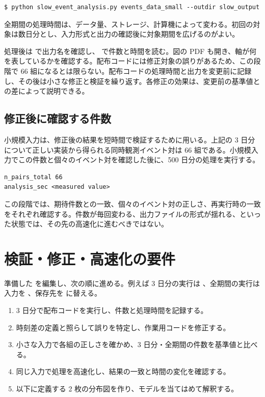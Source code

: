 \begin{lstlisting}[numbers=none, xleftmargin=2\zw]
$ python slow_event_analysis.py events_data_small --outdir slow_output
\end{lstlisting}

全期間の処理時間は、データ量、ストレージ、計算機によって変わる。初回の対象は数日分とし、入力形式と出力の確認後に対象期間を広げるのがよい。

処理後は  で出力名を確認し、 で件数と時間を読む。図の PDF も開き、軸が何を表しているかを確認する。配布コードには修正対象の誤りがあるため、この段階で 66 組になるとは限らない。配布コードの処理時間と出力を変更前に記録し、その後は小さな修正と検証を繰り返す。各修正の効果は、変更前の基準値との差によって説明できる。

\subsection{修正後に確認する件数}

小規模入力は、修正後の結果を短時間で検証するために用いる。上記の 3 日分について正しい実装から得られる同時観測イベント対は 66 組である。小規模入力でこの件数と個々のイベント対を確認した後に、500 日分の処理を実行する。

\begin{lstlisting}[numbers=none, xleftmargin=2\zw]
n_pairs_total 66
analysis_sec <measured value>
\end{lstlisting}

この段階では、期待件数との一致、個々のイベント対の正しさ、再実行時の一致をそれぞれ確認する。件数が毎回変わる、出力ファイルの形式が揺れる、といった状態では、その先の高速化に進むべきではない。

\section{検証・修正・高速化の要件}

準備した  を編集し、次の順に進める。例えば 3 日分の実行は 、全期間の実行は入力を 、保存先を  に替える。

\begin{enumerate}
\item 3 日分で配布コードを実行し、件数と処理時間を記録する。
\item 時刻差の定義と照らして誤りを特定し、作業用コードを修正する。
\item 小さな入力で各組の正しさを確かめ、3 日分・全期間の件数を基準値と比べる。
\item 同じ入力で処理を高速化し、結果の一致と時間の変化を確認する。
\item 以下に定義する 2 枚の分布図を作り、モデルを当てはめて解釈する。
\end{enumerate}

